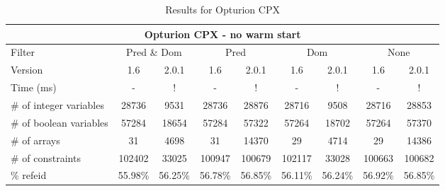 \documentclass{standalone}
\begin{document}
\begin{table}[H]
\footnotesize
\begin{tabular}{lc|c|c|c|c|c|c|c}
\multicolumn{9}{c}{Opturion CPX - no warm start} \\ 
\hline\hline Filter & \multicolumn{2}{c|}{Pred \& Dom} &\multicolumn{2}{c|}{Pred}  & \multicolumn{2}{c|}{Dom} & \multicolumn{2}{c}{None} \\ 
\hline Version & 1.6 & 2.0.1 & 1.6 & 2.0.1 & 1.6 & 2.0.1 & 1.6 & 2.0.1 \\ 
Time (ms)               &    -     & !       & -       & !       & -       & !       & -       & !       \\ 
\# of integer variables & 28736    & 9531    & 28736   & 28876   & 28716   & 9508    & 28716   & 28853	  \\ 
\# of boolean variables & 57284    & 18654   & 57284   & 57322   & 57264   & 18702   & 57264   & 57370	  \\ 
\# of arrays            & 31       & 4698    & 31      & 14370   & 29      & 4714   & 29      & 14386	  \\ 
\# of constraints       & 102402   & 33025   & 100947  & 100679  & 102117  & 33028   & 100663  & 100682  \\ 
\% refeid               & 55.98\%  & 56.25\% & 56.78\% & 56.85\% & 56.11\% & 56.24\% & 56.92\% & 56.85\% \\ 
\end{tabular}
\caption{Results for Opturion CPX}
\end{table}
\end{document}
